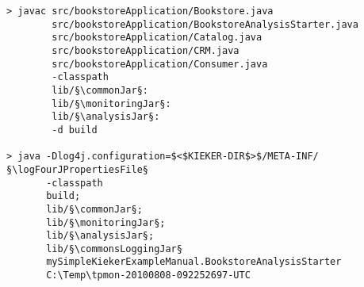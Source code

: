 \begin{lstlisting}[caption=Compile and run under Windows] 			
> javac src/bookstoreApplication/Bookstore.java 
        src/bookstoreApplication/BookstoreAnalysisStarter.java 
        src/bookstoreApplication/Catalog.java 
        src/bookstoreApplication/CRM.java 
        src/bookstoreApplication/Consumer.java
        -classpath
        lib/§\commonJar§:
        lib/§\monitoringJar§:
        lib/§\analysisJar§:
        -d build

> java -Dlog4j.configuration=$<$KIEKER-DIR$>$/META-INF/§\logFourJPropertiesFile§
       -classpath
       build;
       lib/§\commonJar§;
       lib/§\monitoringJar§;
       lib/§\analysisJar§;
       lib/§\commonsLoggingJar§
       mySimpleKiekerExampleManual.BookstoreAnalysisStarter 
       C:\Temp\tpmon-20100808-092252697-UTC
\end{lstlisting}	
